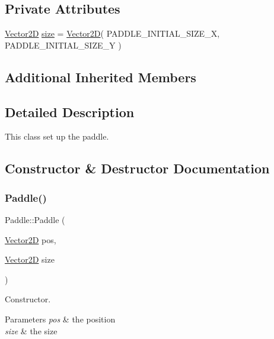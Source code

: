 \subsection*{Private Attributes}
\begin{DoxyCompactItemize}
\item 
\mbox{\hyperlink{struct_vector2_d}{Vector2D}} \mbox{\hyperlink{class_paddle_aa41c1f9a0b8d77d2aba050810cba9b61}{size}} = \mbox{\hyperlink{struct_vector2_d}{Vector2D}}( P\+A\+D\+D\+L\+E\+\_\+\+I\+N\+I\+T\+I\+A\+L\+\_\+\+S\+I\+Z\+E\+\_\+X, P\+A\+D\+D\+L\+E\+\_\+\+I\+N\+I\+T\+I\+A\+L\+\_\+\+S\+I\+Z\+E\+\_\+Y )
\end{DoxyCompactItemize}
\subsection*{Additional Inherited Members}


\subsection{Detailed Description}
This class set up the paddle. 

\subsection{Constructor \& Destructor Documentation}
\mbox{\label{class_paddle_adbc268e4faceefa60ab2a145757020fb}} 
\subsubsection{\texorpdfstring{Paddle()}{Paddle()}}
{\footnotesize\ttfamily Paddle\+::\+Paddle (\begin{DoxyParamCaption}\item[{\mbox{\hyperlink{struct_vector2_d}{Vector2D}}}]{pos,  }\item[{\mbox{\hyperlink{struct_vector2_d}{Vector2D}}}]{size }\end{DoxyParamCaption})}



Constructor. 


\begin{DoxyParams}{Parameters}
{\em pos} & the position \\
\hline
{\em size} & the size \\
\hline
\end{DoxyParams}


